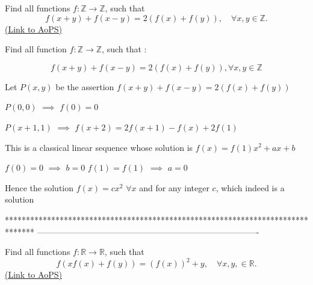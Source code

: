 \begin{problem}
	Find all functions $f : \mathbb{Z} \to\mathbb{Z}$, such that
\[ f(x+y) + f(x-y) = 2(f(x) + f(y)), \quad \forall x, y \in \mathbb{Z}.\]
	\flushright \href{https://artofproblemsolving.com/community/c6h442806}{(Link to AoPS)}
\end{problem}



\begin{solution}
	\begin{tcolorbox}Find all function $f : \mathbb{Z} \rightarrow \mathbb{Z}$, such that :

\[ f(x+y) + f(x-y) = 2(f(x) + f(y)), \forall x, y \in \mathbb{Z} \]\end{tcolorbox}
Let $P(x,y)$ be the assertion $f(x+y)+f(x-y)=2(f(x)+f(y))$

$P(0,0)$ $\implies$ $f(0)=0$

$P(x+1,1)$ $\implies$ $f(x+2)=2f(x+1)-f(x)+2f(1)$

This is a classical linear sequence whose solution is $f(x)=f(1)x^2+ax+b$

$f(0)=0$ $\implies$ $b=0$
$f(1)=f(1)$ $\implies$ $a=0$

Hence the solution $\boxed{f(x)=cx^2}$ $\forall x$ and for any integer $c$, which indeed is a solution
\end{solution}
*******************************************************************************
-------------------------------------------------------------------------------

\begin{problem}
	Find all functions $f : \mathbb{R} \to\mathbb{R}$, such that
\[ f(xf(x) + f(y)) = (f(x))^2 + y, \quad \forall x, y, \in \mathbb{R}. \]
	\flushright \href{https://artofproblemsolving.com/community/c6h442807}{(Link to AoPS)}
\end{problem}



